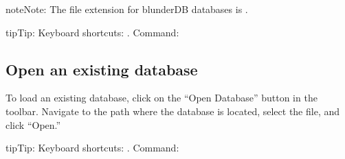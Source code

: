\documentclass[letterpaper,10pt,english]{sphinxmanual}
\begin{document}
\begin{sphinxadmonition}{note}{Note:}
\sphinxAtStartPar
The file extension for blunderDB databases is .
\end{sphinxadmonition}

\begin{sphinxadmonition}{tip}{Tip:}
\sphinxAtStartPar
Keyboard shortcuts: . Command: 
\end{sphinxadmonition}


\subsection{Open an existing database}
\label{\detokenize{guide_utilisateur:ouvrir-une-base-de-donnee-existante}}
\sphinxAtStartPar
To load an existing database, click on the “Open Database” button in the toolbar. Navigate to the path where the database is located, select the  file, and click “Open.”

\begin{sphinxadmonition}{tip}{Tip:}
\sphinxAtStartPar
Keyboard shortcuts: . Command: 
\end{sphinxadmonition}
\end{document}
